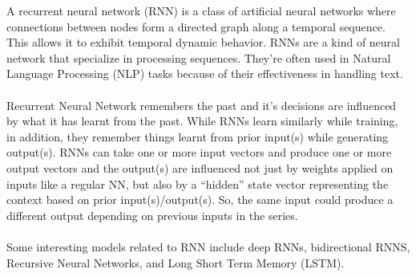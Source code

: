 \documentclass[10pt, oneside]{article}   	%
\begin{document}
A recurrent neural network (RNN) is a class of artificial neural networks where connections between nodes form a directed graph along a temporal sequence. This allows it to exhibit temporal dynamic behavior. RNNs are a kind of neural network that specialize in processing sequences. They’re often used in Natural Language Processing (NLP) tasks because of their effectiveness in handling text.\\\\
Recurrent Neural Network remembers the past and it’s decisions are influenced by what it has learnt from the past. While RNNs learn similarly while training, in addition, they remember things learnt from prior input(s) while generating output(s). RNNs can take one or more input vectors and produce one or more output vectors and the output(s) are influenced not just by weights applied on inputs like a regular NN, but also by a “hidden” state vector representing the context based on prior input(s)/output(s). So, the same input could produce a different output depending on previous inputs in the series.\\\\
Some interesting models related to RNN include deep RNNs, bidirectional RNNS, Recursive Neural Networks, and Long Short Term Memory (LSTM).
\end{document}
